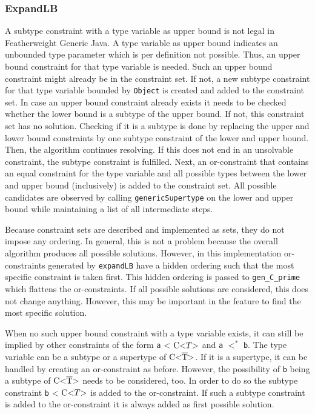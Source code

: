 \subsubsection{ExpandLB}
A subtype constraint with a type variable as upper bound is not legal in Featherweight Generic Java. A type variable as upper bound indicates an unbounded type parameter which is per definition not possible.
Thus, an upper bound constraint for that type variable is needed. Such an upper bound constraint might already be in the constraint set. If not, a new subtype constraint for that type variable bounded by \verb|Object| is created and added to the constraint set.
In case an upper bound constraint already exists it needs to be checked whether the lower bound is a subtype of the upper bound. If not, this constraint set has no solution. Checking if it is a subtype is done by replacing the upper and lower bound constraints by one subtype constraint of the lower and upper bound. Then, the algorithm continues resolving. If this does not end in an unsolvable constraint, the subtype constraint is fulfilled.
Next, an or-constraint that contains an equal constraint for the type variable and all possible types between the lower and upper bound (inclusively) is added to the constraint set. All possible candidates are observed by calling \verb|genericSupertype| on the lower and upper bound while maintaining a list of all intermediate steps.

Because constraint sets are described and implemented as sets, they do not impose any ordering. In general, this is not a problem because the overall algorithm produces all possible solutions. However, in this implementation or-constraints generated by \verb|expandLB| have a hidden ordering such that the most specific constraint is taken first.
This hidden ordering is passed to \verb|gen_C_prime| which flattens the or-constraints. If all possible solutions are considered, this does not change anything.
However, this may be important in the feature to find the most specific solution.

When no such upper bound constraint with a type variable exists, it can still be implied by other constraints of the form \verb|a| < $\text{C} \text{<} T \text{>}$ and \verb|a| $<^*$ \verb|b|. The type variable can be a subtype or a supertype of $\text{C<}\overline{\text{T}}\text{>}$. If it is a supertype, it can be handled by creating an or-constraint as before. However, the possibility of \verb|b| being a subtype of $\text{C<}\overline{\text{T}}\text{>}$ needs to be considered, too.
In order to do so the subtype constraint \verb|b| < $\text{C} \text{<} T \text{>}$ is added to the or-constraint. If such a subtype constraint is added to the or-constraint it is always added as first possible solution.

